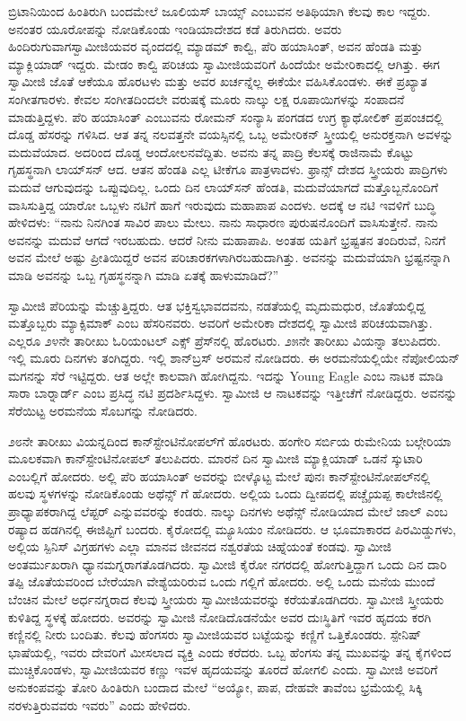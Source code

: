  ಬ್ರಿಟಾನಿಯಿಂದ ಹಿಂತಿರುಗಿ ಬಂದಮೇಲೆ ಜೂಲಿಯಸ್ ಬಾಯ್ಸ್ ಎಂಬುವನ ಅತಿಥಿಯಾಗಿ ಕೆಲವು ಕಾಲ ಇದ್ದರು. ಅನಂತರ ಯೂರೋಪನ್ನು ನೋಡಿಕೊಂಡು ಇಂಡಿಯಾದೇಶದ ಕಡೆ ತಿರುಗಿದರು. ಅವರು ಹಿಂದಿರುಗುವಾಗ\break ಸ್ವಾಮೀಜಿಯವರ ವೃಂದದಲ್ಲಿ ಮ್ಯಾಡಮ್ ಕಾಲ್ವಿ, ಪೆರಿ ಹಯಾಸಿಂತ್, ಅವನ ಹೆಂಡತಿ ಮತ್ತು ಮ್ಯಾಕ್ಲಿಯಾಡ್ ಇದ್ದರು. ಮೇಡಂ ಕಾಲ್ವಿ ಪರಿಚಯ ಸ್ವಾಮೀಜಿಯವರಿಗೆ ಹಿಂದೆಯೇ ಅಮೇರಿಕಾದಲ್ಲಿ ಆಗಿತ್ತು. ಈಗ ಸ್ವಾಮೀಜಿ ಜೊತೆ ಆಕೆಯೂ ಹೊರಟಳು ಮತ್ತು ಅವರ ಖರ್ಚನ್ನೆಲ್ಲ ಈಕೆಯೇ ವಹಿಸಿಕೊಂಡಳು. ಈಕೆ ಪ್ರಖ್ಯಾತ ಸಂಗೀತಗಾರಳು. ಕೇವಲ ಸಂಗೀತದಿಂದಲೇ ವರುಷಕ್ಕೆ ಮೂರು ನಾಲ್ಕು ಲಕ್ಷ ರೂಪಾಯಿಗಳನ್ನು ಸಂಪಾದನೆ ಮಾಡುತ್ತಿದ್ದಳು. ಪೆರಿ ಹಯಾಸಿಂತ್ ಎಂಬುವನು ರೋಮನ್ ಸಂನ್ಯಾಸಿ ಪಂಗಡದ ಉಗ್ರ ಕ್ಯಾಥೋಲಿಕ್ ಪ್ರಪಂಚದಲ್ಲಿ ದೊಡ್ಡ ಹೆಸರನ್ನು ಗಳಿಸಿದ. ಆತ ತನ್ನ ನಲವತ್ತನೇ ವಯಸ್ಸಿನಲ್ಲಿ ಒಬ್ಬ ಅಮೇರಿಕನ್ ಸ್ತ್ರೀಯಲ್ಲಿ ಅನುರಕ್ತನಾಗಿ ಅವಳನ್ನು ಮದುವೆಯಾದ. ಅದರಿಂದ ದೊಡ್ಡ ಆಂದೋಲನವೆದ್ದಿತು. ಅವನು ತನ್ನ ಪಾದ್ರಿ ಕೆಲಸಕ್ಕೆ ರಾಜಿನಾಮೆ ಕೊಟ್ಟು ಗೃಹಸ್ಥನಾಗಿ ಲಾಯ್​ಸನ್ ಆದ. ಆತನ ಹೆಂಡತಿ ಎಲ್ಲ ಟೀಕೆಗೂ ಪಾತ್ರಳಾದಳು. ಫ್ರಾನ್ಸ್ ದೇಶದ ಸ್ತ್ರೀಯರು ಪಾದ್ರಿಗಳು ಮದುವೆ ಆಗುವುದನ್ನು ಒಪ್ಪುವುದಿಲ್ಲ. ಒಂದು ದಿನ ಲಾಯ್​ಸನ್ ಹೆಂಡತಿ, ಮದುವೆಯಾಗದೆ ಮತ್ತೊಬ್ಬನೊಂದಿಗೆ ವಾಸಿಸುತ್ತಿದ್ದ ಯಾರೋ ಒಬ್ಬಳು ನಟಿಗೆ ಹಾಗೆ ಇರುವುದು ಮಹಾಪಾಪ ಎಂದಳು. ಅದಕ್ಕೆ ಆ ನಟಿ ಇವಳಿಗೆ ಬುದ್ಧಿ ಹೇಳಿದಳು: “ನಾನು ನಿನಗಿಂತ ಸಾವಿರ ಪಾಲು ಮೇಲು. ನಾನು ಸಾಧಾರಣ ಪುರುಷನೊಂದಿಗೆ ವಾಸಿಸುತ್ತೇನೆ. ನಾನು ಅವನನ್ನು ಮದುವೆ ಆಗದೆ ಇರಬಹುದು. ಆದರೆ ನೀನು ಮಹಾಪಾಪಿ. ಅಂತಹ ಯತಿಗೆ ಭ್ರಷ್ಟತನ ತಂದಿರುವೆ, ನಿನಗೆ ಅವನ ಮೇಲೆ ಅಷ್ಟು ಪ್ರೀತಿಯಿದ್ದರೆ ಅವನ ಪರಿಚಾರಕಗಳಾಗಿರಬಹುದಾಗಿತ್ತು. ಅವನನ್ನು ಮದುವೆಯಾಗಿ ಭ್ರಷ್ಟನನ್ನಾಗಿ ಮಾಡಿ ಅವನನ್ನು ಒಬ್ಬ ಗೃಹಸ್ಥನನ್ನಾಗಿ ಮಾಡಿ ಏತಕ್ಕೆ ಹಾಳುಮಾಡಿದೆ?” 

 ಸ್ವಾಮೀಜಿ ಪೆರಿಯನ್ನು ಮೆಚ್ಚುತ್ತಿದ್ದರು. ಆತ ಭಕ್ತಿಸ್ವಭಾವದವನು, ನಡತೆಯಲ್ಲಿ ಮೃದುಮಧುರ, ಜೊತೆಯಲ್ಲಿದ್ದ ಮತ್ತೊಬ್ಬರು ಮ್ಯಾಕ್ಸಿಮಾಕ್ ಎಂಬ ಹೆಸರಿನವರು. ಅವರಿಗೆ ಅಮೇರಿಕಾ ದೇಶದಲ್ಲಿ ಸ್ವಾಮೀಜಿ ಪರಿಚಯವಾಗಿತ್ತು. ಎಲ್ಲರೂ ೨೪ನೇ ತಾರೀಖು ಓರಿಯಂಟಲ್ ಎಕ್ಸ್ ಪ್ರೆಸ್‍ನಲ್ಲಿ ಹೊರಟರು. ೨೫ನೇ ತಾರೀಖು ವಿಯನ್ನಾ ತಲುಪಿದರು. ಇಲ್ಲಿ ಮೂರು ದಿನಗಳು ತಂಗಿದ್ದರು. ಇಲ್ಲಿ ಶಾನ್‍ಬ್ರಸ್ ಅರಮನೆ ನೋಡಿದರು. ಈ ಅರಮನೆಯಲ್ಲಿಯೇ ನೆಪೋಲಿಯನ್ ಮಗನನ್ನು ಸೆರೆ ಇಟ್ಟಿದ್ದರು. ಆತ ಅಲ್ಲೇ ಕಾಲವಾಗಿ ಹೋಗಿದ್ದನು. ಇದನ್ನು Young Eagle ಎಂಬ ನಾಟಕ ಮಾಡಿ ಸಾರಾ ಬಾರ್‍ನಾರ್ಡ್ ಎಂಬ ಪ್ರಸಿದ್ಧ ನಟಿ ಪ್ರದರ್ಶಿಸಿದ್ದಳು. ಸ್ವಾಮೀಜಿ ಆ ನಾಟಕವನ್ನು ಇತ್ತೀಚೆಗೆ ನೋಡಿದ್ದರು. ಅವನನ್ನು ಸೆರೆಯಿಟ್ಟ ಅರಮನೆಯ ಸೊಬಗನ್ನು ನೋಡಿದರು. 

 ೨೮ನೇ ತಾರೀಖು ವಿಯನ್ನದಿಂದ ಕಾನ್‍ಸ್ಟೇಂಟಿನೋಪಲ್‍ಗೆ ಹೊರಟರು. ಹಂಗೇರಿ ಸರ್ಬಿಯ ರುಮೇನಿಯ ಬಲ್ಗೇರಿಯಾ ಮೂಲಕವಾಗಿ ಕಾನ್‍ಸ್ಟೇಂಟಿನೋಪಲ್‍ ತಲುಪಿದರು. ಮಾರನೆ ದಿನ ಸ್ವಾಮೀಜಿ ಮ್ಯಾಕ್ಲಿಯಾಡ್ ಒಡನೆ ಸ್ಕುಟಾರಿ ಎಂಬಲ್ಲಿಗೆ ಹೋದರು. ಅಲ್ಲಿ ಪೆರಿ ಹಯಾಸಿಂತ್ ಅವರನ್ನು ಬೀಳ್ಕೊಟ್ಟ ಮೇಲೆ ಪುನಃ ಕಾನ್‍ಸ್ಟೇಂಟಿನೋಪಲ್‍ನಲ್ಲಿ ಹಲವು ಸ್ಥಳಗಳನ್ನು ನೋಡಿಕೊಂಡು ಅಥೆನ್ಸ್ ಗೆ ಹೋದರು. ಅಲ್ಲಿಯ ಒಂದು ದ್ವೀಪದಲ್ಲಿ ಪಚ್ಚೈಯಪ್ಪ ಕಾಲೇಜಿನಲ್ಲಿ ಪ್ರಾಧ್ಯಾಪಕರಾಗಿದ್ದ ಲೆಪ್ಟರ್ ಎನ್ನುವವರನ್ನು ಕಂಡರು. ನಾಲ್ಕು ದಿನಗಳು ಅಥೆನ್ಸ್ ನೋಡಿಯಾದ ಮೇಲೆ ಜಾಲ್ ಎಂಬ ರಷ್ಯಾದ ಹಡಗಿನಲ್ಲಿ ಈಜಿಪ್ಟಿಗೆ ಬಂದರು. ಕೈರೋದಲ್ಲಿ ಮ್ಯೂಸಿಯಂ ನೋಡಿದರು. ಆ ಭೂಮಾಕಾರದ ಪಿರಮಿಡ್ಡುಗಳು, ಅಲ್ಲಿಯ ಸ್ಪಿನಿಸ್ ವಿಗ್ರಹಗಳು ಎಲ್ಲಾ ಮಾನವ ಜೀವನದ ನಶ್ವರತೆಯ ಚಿಹ್ನೆಯಂತೆ ಕಂಡವು. ಸ್ವಾಮೀಜಿ ಅಂತರ್ಮುಖರಾಗಿ ಧ್ಯಾನಮಗ್ನರಾಗತೊಡಗಿದರು. ಸ್ವಾಮೀಜಿ ಕೈರೋ ನಗರದಲ್ಲಿ ಹೋಗುತ್ತಿದ್ದಾಗ ಒಂದು ದಿನ ದಾರಿ ತಪ್ಪಿ ಜೊತೆಯವರಿಂದ ಬೇರೆಯಾಗಿ ವೇಶ್ಯೆಯರಿರುವ ಒಂದು ಗಲ್ಲಿಗೆ ಹೋದರು. ಅಲ್ಲಿ ಒಂದು ಮನೆಯ ಮುಂದೆ ಬೆಂಚಿನ ಮೇಲೆ ಅರ್ಧನಗ್ನರಾದ ಕೆಲವು ಸ್ತ್ರೀಯರು ಸ್ವಾಮೀಜಿಯವರನ್ನು ಕರೆಯತೊಡಗಿದರು. ಸ್ವಾಮೀಜಿ ಸ್ತ್ರೀಯರು ಕುಳಿತಿದ್ದ ಸ್ಥಳಕ್ಕೆ ಹೋದರು. ಅವರನ್ನು ಸ್ವಾಮೀಜಿ ನೋಡಿದೊಡನೆಯೇ ಅವರ ದುಃಸ್ಥಿತಿಗೆ ಇವರ ಹೃದಯ ಕರಗಿ ಕಣ್ಣಿನಲ್ಲಿ ನೀರು ಬಂದಿತು. ಕೆಲವು ಹೆಂಗಸರು ಸ್ವಾಮೀಜಿಯವರ ಬಟ್ಟೆಯನ್ನು ಕಣ್ಣಿಗೆ ಒತ್ತಿಕೊಂಡರು. ಸ್ಪೇನಿಷ್ ಭಾಷೆಯಲ್ಲಿ, ಇವರು ದೇವರಿಗೆ ಮೀಸಲಾದ ವ್ಯಕ್ತಿ ಎಂದು ಕರೆದರು. ಒಬ್ಬ ಹೆಂಗಸು ತನ್ನ ಮುಖವನ್ನು ತನ್ನ ಕೈಗಳಿಂದ ಮುಚ್ಚಿಕೊಂಡಳು, ಸ್ವಾಮೀಜಿಯವರ ಕಣ್ಣು ಇವಳ ಹೃದಯವನ್ನು ತೂರದೆ ಹೋಗಲಿ ಎಂದು. ಸ್ವಾಮೀಜಿ ಅವರಿಗೆ ಅನುಕಂಪವನ್ನು ತೋರಿ ಹಿಂತಿರುಗಿ ಬಂದಾದ ಮೇಲೆ “ಅಯ್ಯೋ, ಪಾಪ, ದೇಹವೇ ತಾವೆಂಬ ಭ್ರಮೆಯಲ್ಲಿ ಸಿಕ್ಕಿ ನರಳುತ್ತಿರುವವರು ಇವರು” ಎಂದು ಹೇಳಿದರು. 

